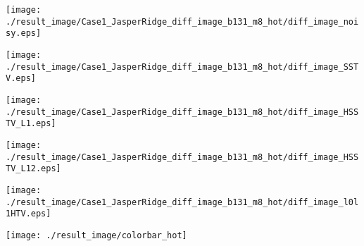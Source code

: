 \begin{figure*}[t]
\begin{center}
        \begin{minipage}{0.150\hsize}
            \centerline{\hspace{\hsize}} %
		\end{minipage}
        \begin{minipage}{0.150\hsize}
            \centerline{\texttt{[image: ./result\_image/Case1\_JasperRidge\_diff\_image\_b131\_m8\_hot/diff\_image\_noisy.eps]}} %
        \end{minipage}
        \begin{minipage}{0.150\hsize}
            \centerline{\texttt{[image: ./result\_image/Case1\_JasperRidge\_diff\_image\_b131\_m8\_hot/diff\_image\_SSTV.eps]}} %
        \end{minipage}
        \begin{minipage}{0.150\hsize}
            \centerline{\texttt{[image: ./result\_image/Case1\_JasperRidge\_diff\_image\_b131\_m8\_hot/diff\_image\_HSSTV\_L1.eps]}} %
        \end{minipage}
        \begin{minipage}{0.150\hsize}
            \centerline{\texttt{[image: ./result\_image/Case1\_JasperRidge\_diff\_image\_b131\_m8\_hot/diff\_image\_HSSTV\_L12.eps]}} %
        \end{minipage}
        \begin{minipage}{0.150\hsize}
            \centerline{\texttt{[image: ./result\_image/Case1\_JasperRidge\_diff\_image\_b131\_m8\_hot/diff\_image\_l0l1HTV.eps]}} %
        \end{minipage}
        \begin{minipage}{0.055\hsize}
            \centerline{\texttt{[image: ./result\_image/colorbar\_hot]}} %
        \end{minipage}

        \vspace{1mm}


\end{center}
\end{figure*}
